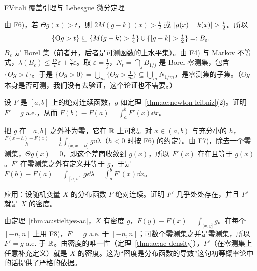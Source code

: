 \begin{probleme}{F}{Vitali 覆盖引理与 Lebesgue 微分定理}
\begin{questions}
\begin{solution}
由 F6)，若 $\Theta g(x)>t$，则 $2M(g-k)(x)>\frac t2$ 或 $\lvert g(x)-k(x)\rvert>\frac t2$。所以
\[
\{\Theta g>t\}\subseteq\{M(g-k)>\tfrac t4\}\cup\{\lvert g-k\rvert>\tfrac t2\}=:B_\varepsilon .
\]
$B_\varepsilon$ 是 Borel 集（前者开，后者是可测函数的上水平集）。由 F4) 与 Markov 不等式，$\lambda(B_\varepsilon)\leqslant\frac{12}t\varepsilon+\frac2t\varepsilon$。取 $\varepsilon=\frac1j$，$N_t=\bigcap_jB_{1/j}$ 是 Borel 零测集，包含 $\{\Theta g>t\}$。于是 $\{\Theta g>0\}=\bigcup_m\{\Theta g>\frac1m\}\subseteq\bigcup_mN_{1/m}$，是零测集的子集。（$\Theta g$ 本身是否可测，我们没有去验证，这个论证也不需要。）
\end{solution}
\item 设 $F$ 是 $[a,b]$ 上的绝对连续函数，$g$ 如定理~\ref{thm:ac:newton-leibniz}(2)。证明 $F'=g$ a.e.，从而 $F(b)-F(a)=\int_a^bF'(x)\dd x$。
\begin{solution}
把 $g$ 在 $[a,b]$ 之外补为零，它在 $\mathbb{R}$ 上可积。对 $x\in(a,b)$ 与充分小的 $h$，$\frac{F(x+h)-F(x)}h=\frac1h\int_{(x,x+h]}g\dd\lambda$（$h<0$ 时按 F6) 的约定）。由 F7)，除去一个零测集，$\Theta g(x)=0$，即这个差商收敛到 $g(x)$，所以 $F'(x)$ 存在且等于 $g(x)$。$F'$ 在零测集之外有定义并等于 $g$，于是 $F(b)-F(a)=\int_{[a,b]}g\dd\lambda=\int_a^bF'(x)\dd x$。
\end{solution}
\item 应用：设随机变量 $X$ 的分布函数 $F$ 绝对连续。证明 $F'$ 几乎处处存在，并且 $F'$ 就是 $X$ 的密度。
\begin{solution}
由定理~\ref{thm:ac:stieltjes-ac}，$X$ 有密度 $g$，$F(y)-F(x)=\int_{(x,y]}g$。在每个 $[-n,n]$ 上用 F8)，$F'=g$ a.e. 于 $[-n,n]$；可数个零测集之并是零测集，所以 $F'=g$ a.e. 于 $\mathbb{R}$。由密度的唯一性（定理~\ref{thm:ac:ac-density}），$F'$（在零测集上任意补充定义）就是 $X$ 的密度。这为“密度是分布函数的导数”这句初等概率论中的话提供了严格的依据。
\end{solution}
\end{questions}
\end{probleme}
